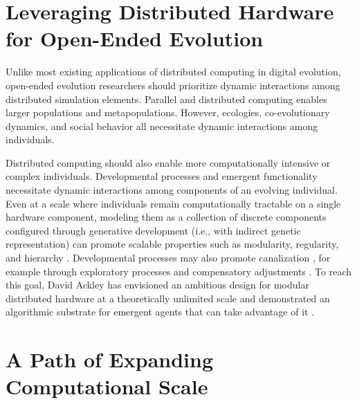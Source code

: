 \section{Leveraging Distributed Hardware for Open-Ended Evolution}

Unlike most existing applications of distributed computing in digital evolution, open-ended evolution researchers should prioritize dynamic interactions among distributed simulation elements.
Parallel and distributed computing enables larger populations and metapopulations.
However, ecologies, co-evolutionary dynamics, and social behavior all necessitate dynamic interactions among individuals.

Distributed computing should also enable more computationally intensive or complex individuals.
Developmental processes and emergent functionality necessitate dynamic interactions among components of an evolving individual.
Even at a scale where individuals remain computationally tractable on a single hardware component, modeling them as a collection of discrete components configured through generative development (i.e., with indirect genetic representation) can promote scalable properties \cite{lipson2007principles} such as modularity, regularity, and hierarchy \cite{hornby2005measuring, clune2011performance}.
Developmental processes may also promote canalization \cite{stanley2003taxonomy}, for example through exploratory processes and compensatory adjustments \cite{gerhart2007theory}.
To reach this goal, David Ackley has envisioned an ambitious design for modular distributed hardware at a theoretically unlimited scale \cite{ackley2011pursue} and demonstrated an algorithmic substrate for emergent agents that can take advantage of it \cite{ackley2018digital}.

\section{A Path of Expanding Computational Scale}

